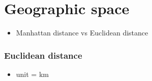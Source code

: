 \documentclass[11pt]{article}
\providecommand{\tightlist}{%
      \setlength{\itemsep}{0pt}\setlength{\parskip}{0pt}}
\begin{document}
    \section{Geographic space}\label{geographic-space}

\begin{itemize}
\tightlist
\item
  Manhattan distance vs Euclidean distance
\end{itemize}

    \subsubsection{Euclidean distance}\label{euclidean-distance}

\begin{itemize}
\tightlist
\item
  unit = km
\end{itemize}
\end{document}
